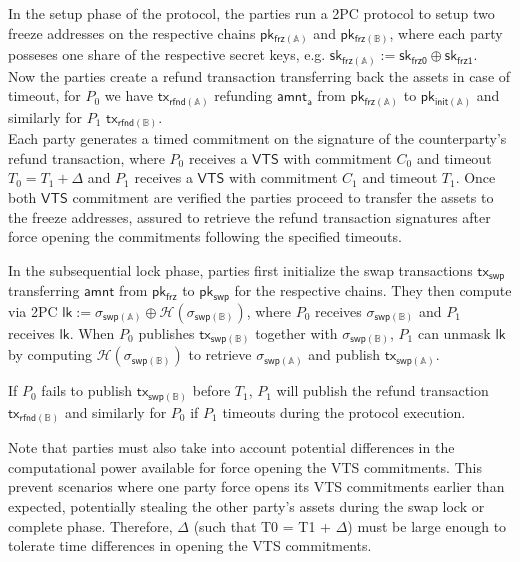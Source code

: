 \documentclass{article}      	%
\begin{document}
In the setup phase of the protocol, the parties run a 2PC protocol to setup two freeze addresses on the respective chains $\mathsf{pk_{frz(\mathbb{A})}}$ and $\mathsf{pk_{frz(\mathbb{B})}}$, where each party posseses one share of the respective secret keys, e.g. $\mathsf{sk_{frz(\mathbb{A})}} := \mathsf{sk_{frz0}} \oplus  \mathsf{sk_{frz1}}$. \\
Now the parties create a refund transaction transferring back the assets in case of timeout, for $P_0$ we have $\mathsf{tx_{rfnd(\mathbb{A})}}$ refunding $\mathsf{amnt_a}$ from $\mathsf{pk_{frz(\mathbb{A})}}$ to $\mathsf{pk_{init(\mathbb{A})}}$ and similarly for $P_1$ $\mathsf{tx_{rfnd(\mathbb{B})}}$. \\
Each party generates a timed commitment on the signature of the counterparty's refund transaction, where $P_0$ receives a $\mathsf{VTS}$ with commitment $C_0$ and timeout $T_0 = T_1 + \Delta$ and $P_1$ receives a $\mathsf{VTS}$ with commitment $C_1$ and timeout $T_1$. Once both $\mathsf{VTS}$ commitment are verified the parties proceed to transfer the assets to the freeze addresses, assured to retrieve the refund transaction signatures after force opening the commitments following the specified timeouts.

In the subsequential lock phase, parties first initialize the swap transactions $\mathsf{tx_{swp}}$ transferring $\mathsf{amnt}$ from $\mathsf{pk_{frz}}$ to $\mathsf{pk_{swp}}$ for the respective chains. They then compute via 2PC $\mathsf{lk} := \sigma_{\mathsf{swp}(\mathbb{A})} \oplus \mathcal{H}(\sigma_{\mathsf{swp}(\mathbb{B})})$, where  $P_0$ receives $\sigma_{\mathsf{swp}(\mathbb{B})}$ and $P_1$ receives $\mathsf{lk}$.  When $P_0$ publishes $\mathsf{tx_{swp(\mathbb{B})}}$ together with  $\sigma_{\mathsf{swp}(\mathbb{B})}$, $P_1$ can unmask $\mathsf{lk}$ by computing $\mathcal{H}(\sigma_{\mathsf{swp}(\mathbb{B})})$ to retrieve $\sigma_{\mathsf{swp}(\mathbb{A})}$ and publish $\mathsf{tx_{swp(\mathbb{A})}}$.

 If $P_0$ fails to publish $\mathsf{tx_{swp(\mathbb{B})}}$ before $T_1$, $P_1$ will publish the refund transaction $\mathsf{tx_{rfnd(\mathbb{B})}}$ and similarly for $P_0$ if $P_1$ timeouts during the protocol execution.

Note that parties must also take into account potential differences in the computational power available for force opening the VTS commitments. This prevent scenarios where one party force opens its VTS commitments earlier than expected, potentially stealing 
 the other party's assets during the swap lock or complete phase. Therefore,  $\Delta$ (such that T0 = T1 + $\Delta$) must be large enough to tolerate time differences in opening the VTS commitments. \\
\end{document}
